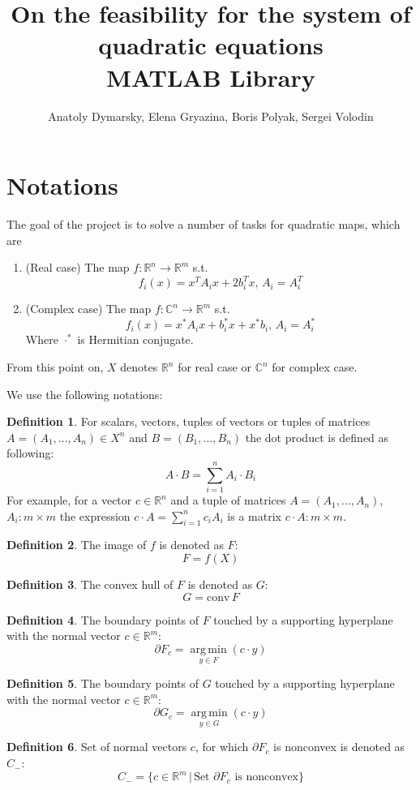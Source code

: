 \documentclass[a4paper]{article}
\title{On the feasibility for the system of quadratic equations\\MATLAB Library}
\date{}
\author{Anatoly Dymarsky, Elena Gryazina, Boris Polyak, Sergei Volodin}
\DeclareMathOperator*{\argmin}{arg\,min}
\newcommand{\R}{\mathbb{R}}
\newcommand{\conv}{\mbox{conv}\,}
\theoremstyle{definition}
\newtheorem{definition}{Definition}[section]
\begin{document}
\maketitle
\section{Notations}
The goal of the project is to solve a number of tasks for quadratic maps, which are
\begin{enumerate}
\item (Real case) The map $f\colon \mathbb{R}^n\to\mathbb{R}^m$ s.t. $$f_i(x)=x^TA_ix+2b_i^Tx,\, A_i=A_i^T$$
\item (Complex case) The map $f\colon \mathbb{C}^n\to\mathbb{R}^m$ s.t. $$f_i(x)=x^*A_ix+b_i^*x+x^*b_i,\, A_i=A_i^*$$
Where $\cdot^*$ is Hermitian conjugate.
\end{enumerate}

From this point on, $X$ denotes $\mathbb{R}^n$ for real case or $\mathbb{C}^n$ for complex case.

We use the following notations:
\theoremstyle{definition}
\begin{definition} For scalars, vectors, tuples of vectors or tuples of matrices $A=(A_1,...,A_n)\in X^n$ and $B=(B_1,...,B_n)$ the dot product is defined as following: $$A\cdot B=\sum\limits_{i=1}^nA_i\cdot B_i$$
For example, for a vector $c\in \mathbb{R}^n$ and a tuple of matrices $A=(A_1,...,A_n)$, $A_i\colon m\times m$ the expression $c\cdot A=\sum\limits_{i=1}^nc_iA_i$ is a matrix $c\cdot A\colon m\times m$.
\end{definition}
\begin{definition} The image of $f$ is denoted as $F$:
	$$F=f(X)$$
\end{definition}
\begin{definition} The convex hull of $F$ is denoted as $G$:
	$$G=\conv F$$
\end{definition}
\begin{definition} The boundary points of $F$ touched by a supporting hyperplane with the normal vector $c\in\mathbb{R}^m$:
	$$\partial F_c=\argmin\limits_{y\in F}(c\cdot y)$$
\end{definition}
\begin{definition} The boundary points of $G$ touched by a supporting hyperplane with the normal vector $c\in\mathbb{R}^m$:
	$$\partial G_c=\argmin\limits_{y\in G}(c\cdot y)$$
\end{definition}
\begin{definition}\label{ex:c_minus}
	Set of normal vectors $c$, for which $\partial F_c$ is nonconvex is denoted as $C_-$:
	$$
	C_-=\{c\in\R^m\,\big|\,\mbox{Set }\partial F_c\mbox{ is nonconvex}\}
	$$
\end{definition}
\end{document}

